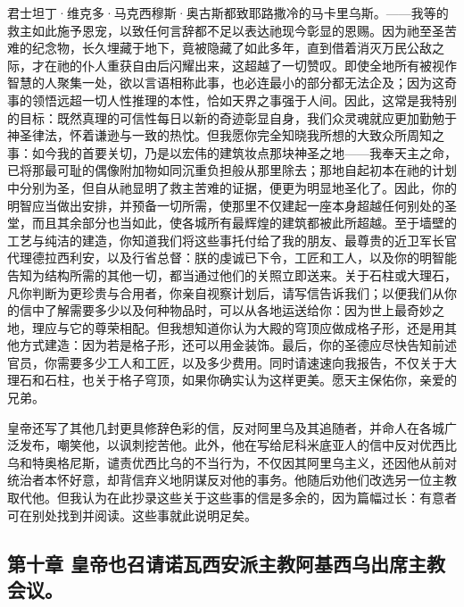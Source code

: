 \par

君士坦丁·维克多·马克西穆斯·奥古斯都致耶路撒冷的马卡里乌斯。——我等的救主如此施予恩宠，以致任何言辞都不足以表达祂现今彰显的恩赐。因为祂至圣苦难的纪念物，长久埋藏于地下，竟被隐藏了如此多年，直到借着消灭万民公敌之际，才在祂的仆人重获自由后闪耀出来，这超越了一切赞叹。即使全地所有被视作智慧的人聚集一处，欲以言语相称此事，也必连最小的部分都无法企及；因为这奇事的领悟远超一切人性推理的本性，恰如天界之事强于人间。因此，这常是我特别的目标：既然真理的可信性每日以新的奇迹彰显自身，我们众灵魂就应更加勤勉于神圣律法，怀着谦逊与一致的热忱。但我愿你完全知晓我所想的大致众所周知之事：如今我的首要关切，乃是以宏伟的建筑妆点那块神圣之地——我奉天主之命，已将那最可耻的偶像附加物如同沉重负担般从那里除去；那地自起初本在祂的计划中分别为圣，但自从祂显明了救主苦难的证据，便更为明显地圣化了。因此，你的明智应当做出安排，并预备一切所需，使那里不仅建起一座本身超越任何别处的圣堂，而且其余部分也当如此，使各城所有最辉煌的建筑都被此所超越。至于墙壁的工艺与纯洁的建造，你知道我们将这些事托付给了我的朋友、最尊贵的近卫军长官代理德拉西利安，以及行省总督：朕的虔诚已下令，工匠和工人，以及你的明智能告知为结构所需的其他一切，都当通过他们的关照立即送来。关于石柱或大理石，凡你判断为更珍贵与合用者，你亲自视察计划后，请写信告诉我们；以便我们从你的信中了解需要多少以及何种物品时，可以从各地运送给你：因为世上最奇妙之地，理应与它的尊荣相配。但我想知道你认为大殿的穹顶应做成格子形，还是用其他方式建造：因为若是格子形，还可以用金装饰。最后，你的圣德应尽快告知前述官员，你需要多少工人和工匠，以及多少费用。同时请速速向我报告，不仅关于大理石和石柱，也关于格子穹顶，如果你确实认为这样更美。愿天主保佑你，亲爱的兄弟。\par

皇帝还写了其他几封更具修辞色彩的信，反对阿里乌及其追随者，并命人在各城广泛发布，嘲笑他，以讽刺挖苦他。此外，他在写给尼科米底亚人的信中反对优西比乌和特奥格尼斯，谴责优西比乌的不当行为，不仅因其阿里乌主义，还因他从前对统治者本怀好意，却背信弃义地阴谋反对他的事务。他随后劝他们改选另一位主教取代他。但我认为在此抄录这些关于这些事的信是多余的，因为篇幅过长：有意者可在别处找到并阅读。这些事就此说明足矣。\par


\subsection{第十章 皇帝也召请诺瓦西安派主教阿基西乌出席主教会议。}

